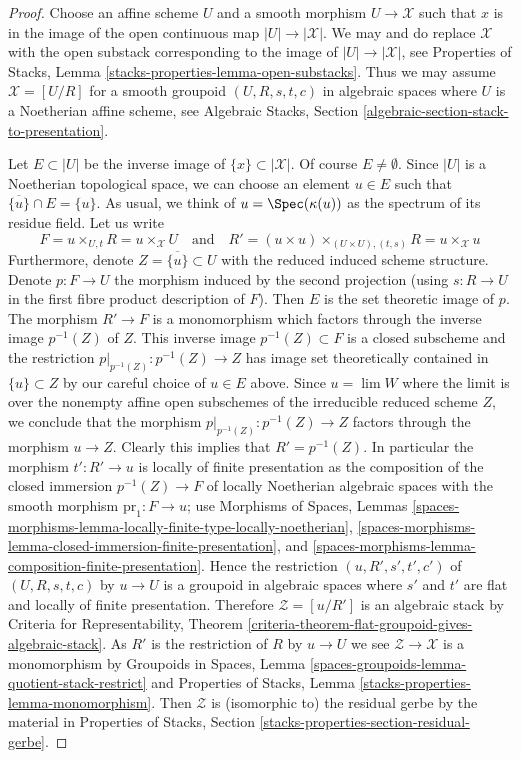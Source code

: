 \begin{proof}
Choose an affine scheme $U$ and a smooth morphism $U \to \mathcal{X}$
such that $x$ is in the image of the open continuous map
$|U| \to |\mathcal{X}|$. We may and do replace $\mathcal{X}$
with the open substack corresponding to the image of $|U| \to |\mathcal{X}|$,
see Properties of Stacks, Lemma \ref{stacks-properties-lemma-open-substacks}.
Thus we may assume $\mathcal{X} = [U/R]$ for a smooth
groupoid $(U, R, s, t, c)$ in algebraic spaces
where $U$ is a Noetherian affine scheme, see
Algebraic Stacks, Section \ref{algebraic-section-stack-to-presentation}.

\medskip\noindent
Let $E \subset |U|$ be the inverse image of $\{x\} \subset |\mathcal{X}|$.
Of course $E \not = \emptyset$.
Since $|U|$ is a Noetherian topological space, we can choose an element
$u \in E$ such that $\overline{\{u\}} \cap E = \{u\}$.
As usual, we think of $u = \Spec(\kappa(u))$ as the spectrum of
its residue field. Let us write
$$
F = u \times_{U, t} R = u \times_\mathcal{X} U
\quad\text{and}\quad
R' = (u \times u) \times_{(U \times U), (t, s)} R = u \times_\mathcal{X} u
$$
Furthermore, denote $Z = \overline{\{u\}} \subset U$ with the reduced
induced scheme structure. Denote $p : F \to U$ the morphism induced
by the second projection (using $s : R \to U$ in the first fibre product
description of $F$). Then $E$ is the set theoretic image of $p$.
The morphism $R' \to F$ is a monomorphism which factors through the
inverse image $p^{-1}(Z)$ of $Z$. This inverse image
$p^{-1}(Z) \subset F$ is a closed subscheme and
the restriction $p|_{p^{-1}(Z)} : p^{-1}(Z) \to Z$ has image
set theoretically contained in $\{u\} \subset Z$ by our careful
choice of $u \in E$ above. Since $u = \lim W$ where the limit
is over the nonempty affine open subschemes of the irreducible reduced scheme
$Z$, we conclude that the morphism $p|_{p^{-1}(Z)} : p^{-1}(Z) \to Z$
factors through the morphism $u \to Z$. Clearly this implies that
$R' = p^{-1}(Z)$. In particular the morphism $t' : R' \to u$ is
locally of finite presentation as the composition of the closed
immersion $p^{-1}(Z) \to F$ of locally Noetherian algebraic spaces
with the smooth morphism $\text{pr}_1 : F \to u$; use
Morphisms of Spaces, Lemmas
\ref{spaces-morphisms-lemma-locally-finite-type-locally-noetherian},
\ref{spaces-morphisms-lemma-closed-immersion-finite-presentation}, and
\ref{spaces-morphisms-lemma-composition-finite-presentation}.
Hence the restriction $(u, R', s', t', c')$ of $(U, R, s, t, c)$
by $u \to U$ is a groupoid in algebraic spaces where $s'$ and $t'$
are flat and locally of finite presentation. Therefore
$\mathcal{Z} = [u/R']$ is an algebraic stack by
Criteria for Representability, Theorem
\ref{criteria-theorem-flat-groupoid-gives-algebraic-stack}.
As $R'$ is the restriction of $R$ by $u \to U$ we see
$\mathcal{Z} \to \mathcal{X}$ is a monomorphism by
Groupoids in Spaces, Lemma
\ref{spaces-groupoids-lemma-quotient-stack-restrict}
and
Properties of Stacks, Lemma \ref{stacks-properties-lemma-monomorphism}.
Then $\mathcal{Z}$ is (isomorphic to) the residual gerbe by
the material in Properties of Stacks, Section
\ref{stacks-properties-section-residual-gerbe}.
\end{proof}

